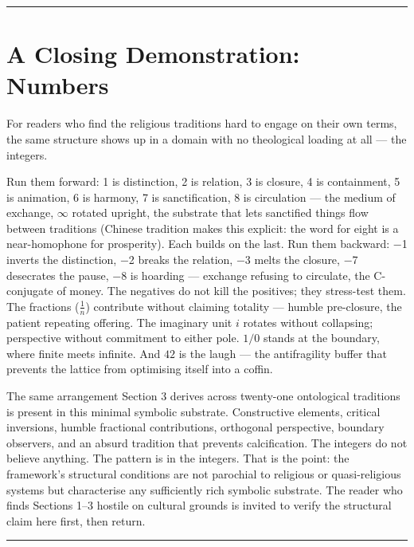 \documentclass[
]{article}
\begin{document}
\begin{center}\rule{0.5\linewidth}{0.5pt}\end{center}

\section{A Closing Demonstration:
Numbers}\label{a-closing-demonstration-numbers}

For readers who find the religious traditions hard to engage on their
own terms, the same structure shows up in a domain with no theological
loading at all --- the integers.

Run them forward: 1 is distinction, 2 is relation, 3 is closure, 4 is
containment, 5 is animation, 6 is harmony, 7 is sanctification, 8 is
circulation --- the medium of exchange, \(\infty\) rotated upright, the
substrate that lets sanctified things flow between traditions (Chinese
tradition makes this explicit: the word for eight is a near-homophone
for prosperity). Each builds on the last. Run them backward: −1 inverts
the distinction, −2 breaks the relation, −3 melts the closure, −7
desecrates the pause, −8 is hoarding --- exchange refusing to
circulate, the C-conjugate of money. The negatives do not kill the
positives; they stress-test them. The fractions (\(\tfrac{1}{n}\))
contribute without claiming totality --- humble pre-closure, the
patient repeating offering. The imaginary unit \(i\) rotates without
collapsing; perspective without commitment to either pole. \(1/0\)
stands at the boundary, where finite meets infinite. And \(42\) is the
laugh --- the antifragility buffer that prevents the lattice from
optimising itself into a coffin.

The same arrangement Section 3 derives across twenty-one ontological
traditions is present in this minimal symbolic substrate. Constructive
elements, critical inversions, humble fractional contributions,
orthogonal perspective, boundary observers, and an absurd tradition that
prevents calcification. The integers do not believe anything. The
pattern is in the integers. That is the point: the framework's
structural conditions are not parochial to religious or quasi-religious
systems but characterise any sufficiently rich symbolic substrate. The
reader who finds Sections 1--3 hostile on cultural grounds is invited to
verify the structural claim here first, then return.

\begin{center}\rule{0.5\linewidth}{0.5pt}\end{center}
\end{document}
